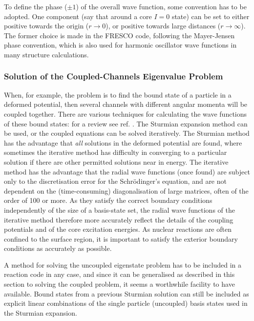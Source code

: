 \documentclass[11pt,a4paper]{article}
\begin{document}
To define the phase ($\pm 1$) of the overall wave function, some
convention has to be adopted.
One component (say that around a core $I=0$ state)
can be set to either positive towards the origin ($r\rightarrow 0$),
or positive towards large distances ($r\rightarrow \infty$).
The former choice is made in the FRESCO code,
following the Mayer-Jensen phase convention,
which is also used for harmonic oscillator
wave functions in many structure calculations.
\subsubsection{Solution of the Coupled-Channels Eigenvalue Problem}

When, for example, the problem is to find the bound state of a particle in
a deformed potential, then
several channels with different angular momenta will be coupled together.
There are various techniques for calculating the wave functions of these bound states:
for a review see ref. \cite{ogle71}.
The Sturmian expansion method \cite{Sturm}
can be used, or the coupled equations can be solved iteratively.
The Sturmian method has the advantage that {\em all} solutions in the
deformed potential are found, where sometimes the
iterative method has difficulty in converging to a particular solution if there
are other permitted solutions near in energy.
The iterative method has the advantage that the radial wave functions
(once found) are subject only to the discretisation error for the
Schr\"odinger's equation, and are not dependent on the
(time-consuming) diagonalisation
of large matrices, often of the order of 100 or more.
As they satisfy the correct boundary conditions independently of the size
of a basis-state set,
the radial wave functions of the iterative method therefore more accurately reflect
the details of the coupling potentials and of the core excitation energies.
As nuclear reactions are often confined to the surface region,
it is important to satisfy the exterior boundary conditions
as accurately as possible.

A method for solving the uncoupled eigenstate problem has to be
included in a reaction code in any case,
and since it can be generalised as described in this section
to solving the coupled problem, it seems a worthwhile facility to have available.
Bound states from a previous Sturmian solution can still be included as explicit
linear combinations of the single particle (uncoupled) basis states used in the
Sturmian expansion.
\end{document}

